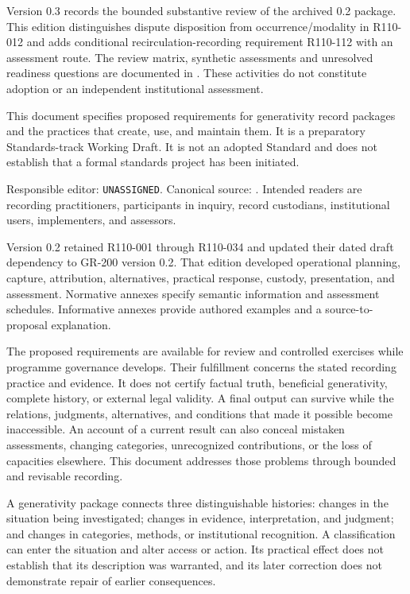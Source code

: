 \documentclass[11pt,a4paper]{article}
\begin{document}
\GSPfrontmatter
{}
Version 0.3 records the bounded substantive review of the archived 0.2 package. This edition distinguishes dispute disposition from occurrence/modality in R110-012 and adds conditional recirculation-recording requirement R110-112 with an assessment route. The review matrix, synthetic assessments and unresolved readiness questions are documented in . These activities do not constitute adoption or an independent institutional assessment.

This document specifies proposed requirements for generativity record packages and the practices that create, use, and maintain them. It is a preparatory Standards-track Working Draft. It is not an adopted Standard and does not establish that a formal standards project has been initiated.

Responsible editor: \texttt{UNASSIGNED}. Canonical source: . Intended readers are recording practitioners, participants in inquiry, record custodians, institutional users, implementers, and assessors.

Version 0.2 retained R110-001 through R110-034 and updated their dated draft dependency to GR-200 version 0.2. That edition developed operational planning, capture, attribution, alternatives, practical response, custody, presentation, and assessment. Normative annexes specify semantic information and assessment schedules. Informative annexes provide authored examples and a source-to-proposal explanation.

The proposed requirements are available for review and controlled exercises while programme governance develops. Their fulfillment concerns the stated recording practice and evidence. It does not certify factual truth, beneficial generativity, complete history, or external legal validity.
\tableofcontents
\clearpage
{}
A final output can survive while the relations, judgments, alternatives, and conditions that made it possible become inaccessible. An account of a current result can also conceal mistaken assessments, changing categories, unrecognized contributions, or the loss of capacities elsewhere. This document addresses those problems through bounded and revisable recording.

A generativity package connects three distinguishable histories: changes in the situation being investigated; changes in evidence, interpretation, and judgment; and changes in categories, methods, or institutional recognition. A classification can enter the situation and alter access or action. Its practical effect does not establish that its description was warranted, and its later correction does not demonstrate repair of earlier consequences.
\end{document}
